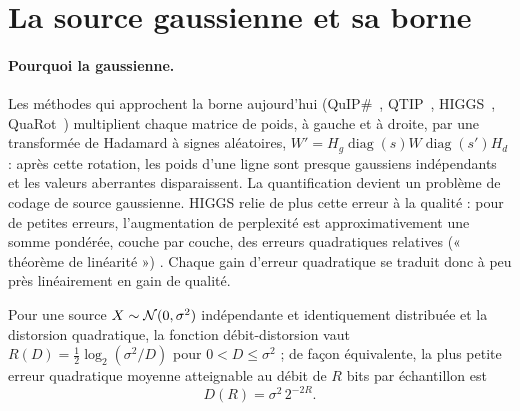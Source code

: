 \section{La source gaussienne et sa borne}\label{sec:shannon}

\paragraph{Pourquoi la gaussienne.} Les méthodes qui approchent la borne aujourd'hui (QuIP\#~\cite{quipsharp2024}, QTIP~\cite{qtip2024}, HIGGS~\cite{higgs2024}, QuaRot~\cite{quarot2024}) multiplient chaque matrice de poids, à gauche et à droite, par une transformée de Hadamard à signes aléatoires, $W' = H_g \operatorname{diag}(s) W \operatorname{diag}(s') H_d$ : après cette rotation, les poids d'une ligne sont presque gaussiens indépendants et les valeurs aberrantes disparaissent. La quantification devient un problème de codage de source gaussienne. HIGGS relie de plus cette erreur à la qualité : pour de petites erreurs, l'augmentation de perplexité est approximativement une somme pondérée, couche par couche, des erreurs quadratiques relatives (« théorème de linéarité ») \litt. Chaque gain d'erreur quadratique se traduit donc à peu près linéairement en gain de qualité.

\begin{theoreme}\label{thm:shannon}
Pour une source $X \sim \mathcal{N}(0, \sigma^2)$ indépendante et identiquement distribuée et la distorsion quadratique, la fonction débit-distorsion vaut $R(D) = \tfrac12 \log_2(\sigma^2/D)$ pour $0 < D \le \sigma^2$ ; de façon équivalente, la plus petite erreur quadratique moyenne atteignable au débit de $R$ bits par échantillon est
\begin{equation}\label{eq:shannon}
D(R) = \sigma^2\, 2^{-2R}.
\end{equation}
\end{theoreme}

